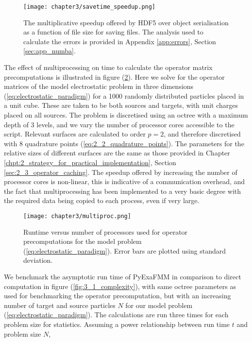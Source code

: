 \begin{figure}
    \centering

  {\texttt{[image: chapter3/savetime\_speedup.png]}}
  \vspace{0pt}
    \caption{
        The multiplicative speedup offered by HDF5 over object serialisation
        as a function of file size for saving files.
        The analysis used to calculate the errors is provided in
        Appendix \ref{app:errors}, Section \ref{sec:app_numba}.
    }
    \label{fig:3_1_savetime_speedup}
\end{figure}


The effect of multiprocessing on time to calculate the operator matrix precomputations is
illustrated in figure (\ref{fig:3_1_multiproc}). Here we solve
for the operator matrices of the model electrostatic problem in three dimensions
(\ref{eq:electrostatic_paradigm}) for a 1000 randomly distributed particles placed in
a unit cube. These are taken to be both sources and targets, with unit charges
placed on all sources. The problem is discretised using an octree with a maximum depth of 3 levels,
and we vary the number of processor cores accessible to the script.
Relevant surfaces are calculated to order $p=2$, and therefore discretised
with 8 quadrature points (\ref{eq:2_2_quadrature_points}). The parameters for
the relative sizes of different surfaces are the same as those provided
in Chapter \ref{chpt:2_strategy_for_practical_implementation},
Section \ref{sec:2_3_operator_caching}. The speedup offered by increasing the
number of processor cores is non-linear, this is indicative of a communication
overhead, and the fact that multiprocessing has been implemented to a very
basic degree with the required data being copied to each process, even if very large.

\begin{figure}[ht]
    \centering

  {\texttt{[image: chapter3/multiproc.png]}}
  \vspace{0pt}
    \caption{Runtime versus number of processors used for operator precomputations
    for the model problem (\ref{eq:electrostatic_paradigm}). Error bars are
    plotted using standard deviation.
    }
    \label{fig:3_1_multiproc}
\end{figure}

We benchmark the asymptotic run time of \gls{PyExaFMM} in comparison to direct computation in figure
(\ref{fig:3_1_complexity}), with same octree parameters as used for benchmarking
the operator precomputation, but with an increasing number of target and source
particles $N$ for our model problem (\ref{eq:electrostatic_paradigm}). The
calculations are run three times for each problem size for statistics.
Assuming a power relationship between run time $t$ and problem size $N$,


